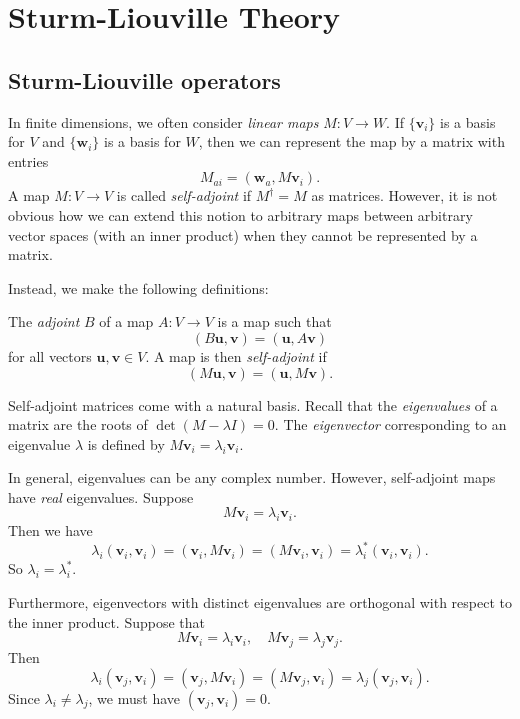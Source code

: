 \documentclass[a4paper]{article}
\begin{document}
\section{Sturm-Liouville Theory}
\subsection{Sturm-Liouville operators}
In finite dimensions, we often consider \emph{linear maps} $M: V\to W$. If $\{\mathbf{v}_i\}$ is a basis for $V$ and $\{\mathbf{w}_i\}$ is a basis for $W$, then we can represent the map by a matrix with entries
\[
  M_{ai} = (\mathbf{w}_a, M\mathbf{v}_i).
\]
A map $M: V\to V$ is called \emph{self-adjoint} if $M^\dagger = M$ as matrices. However, it is not obvious how we can extend this notion to arbitrary maps between arbitrary vector spaces (with an inner product) when they cannot be represented by a matrix.

Instead, we make the following definitions:
\begin{defi}
  The \emph{adjoint} $B$ of a map $A: V\to V$ is a map such that
  \[
    (B\mathbf{u}, \mathbf{v}) = (\mathbf{u}, A\mathbf{v})
  \]
  for all vectors $\mathbf{u}, \mathbf{v}\in V$. A map is then \emph{self-adjoint} if
  \[
    (M\mathbf{u}, \mathbf{v}) = (\mathbf{u}, M\mathbf{v}).
  \]
\end{defi}
Self-adjoint matrices come with a natural basis. Recall that the \emph{eigenvalues} of a matrix are the roots of $\det(M - \lambda I) = 0$. The \emph{eigenvector} corresponding to an eigenvalue $\lambda$ is defined by $M\mathbf{v}_i = \lambda_i \mathbf{v}_i$.

In general, eigenvalues can be any complex number. However, self-adjoint maps have \emph{real} eigenvalues. Suppose
\[
  M\mathbf{v}_i = \lambda_i \mathbf{v}_i.
\]
Then we have
\[
  \lambda_i (\mathbf{v}_i, \mathbf{v}_i) = (\mathbf{v}_i, M\mathbf{v}_i) = (M\mathbf{v}_i, \mathbf{v}_i) = \lambda_i^* (\mathbf{v}_i, \mathbf{v}_i).
\]
So $\lambda_i = \lambda_i^*$.

Furthermore, eigenvectors with distinct eigenvalues are orthogonal with respect to the inner product. Suppose that
\[
  M \mathbf{v}_i = \lambda_i \mathbf{v}_i,\quad M \mathbf{v}_j = \lambda_j \mathbf{v}_j.
\]
Then
\[
  \lambda_i (\mathbf{v}_j, \mathbf{v}_i) = (\mathbf{v}_j, M\mathbf{v}_i) = (M\mathbf{v}_j, \mathbf{v}_i) = \lambda_j(\mathbf{v}_j, \mathbf{v}_i).
\]
Since $\lambda_i \not= \lambda_j$, we must have $(\mathbf{v}_j, \mathbf{v}_i) = 0$.
\end{document}
